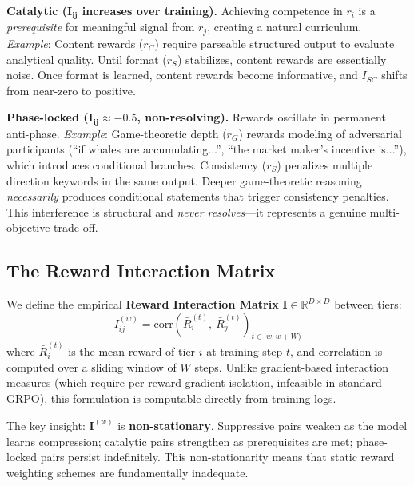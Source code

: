 \documentclass[sigconf]{acmart}
\begin{document}
\textbf{Catalytic ($\mathbf{I_{ij}}$ increases over training).} Achieving competence in $r_i$ is a \textit{prerequisite} for meaningful signal from $r_j$, creating a natural curriculum. \textit{Example}: Content rewards ($r_C$) require parseable structured output to evaluate analytical quality. Until format ($r_S$) stabilizes, content rewards are essentially noise. Once format is learned, content rewards become informative, and $I_{SC}$ shifts from near-zero to positive.

\textbf{Phase-locked ($\mathbf{I_{ij} \approx -0.5}$, non-resolving).} Rewards oscillate in permanent anti-phase. \textit{Example}: Game-theoretic depth ($r_G$) rewards modeling of adversarial participants (``if whales are accumulating...'', ``the market maker's incentive is...''), which introduces conditional branches. Consistency ($r_S$) penalizes multiple direction keywords in the same output. Deeper game-theoretic reasoning \textit{necessarily} produces conditional statements that trigger consistency penalties. This interference is structural and \textit{never resolves}---it represents a genuine multi-objective trade-off.

\subsection{The Reward Interaction Matrix}

We define the empirical \textbf{Reward Interaction Matrix} $\mathbf{I} \in \mathbb{R}^{D \times D}$ between tiers:
\begin{equation}
    I_{ij}^{(w)} = \text{corr}\!\left(\bar{R}_i^{(t)},\ \bar{R}_j^{(t)}\right)_{t \in [w, w+W)}
    \label{eq:interaction}
\end{equation}
where $\bar{R}_i^{(t)}$ is the mean reward of tier $i$ at training step $t$, and correlation is computed over a sliding window of $W$ steps. Unlike gradient-based interaction measures (which require per-reward gradient isolation, infeasible in standard GRPO), this formulation is computable directly from training logs.

The key insight: $\mathbf{I}^{(w)}$ is \textbf{non-stationary}. Suppressive pairs weaken as the model learns compression; catalytic pairs strengthen as prerequisites are met; phase-locked pairs persist indefinitely. This non-stationarity means that static reward weighting schemes are fundamentally inadequate.
\end{document}
